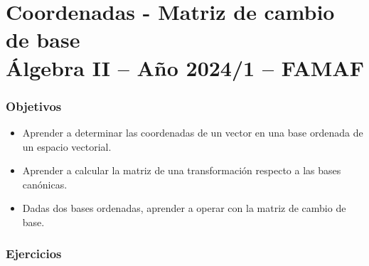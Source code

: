 \chapter{Coordenadas - Matriz de cambio de base \\ Álgebra  II -- Año 2024/1 -- FAMAF}\label{practico-8}
    

\subsection*{Objetivos}
\begin{itemize}
\item Aprender a determinar las coordenadas de un vector en una base ordenada de un espacio vectorial.
\item Aprender a calcular la matriz de una transformación respecto a las bases canónicas.
\item Dadas dos bases ordenadas, aprender a operar con la matriz de cambio de base.
\end{itemize}
    
    
\subsection*{Ejercicios} 
    
